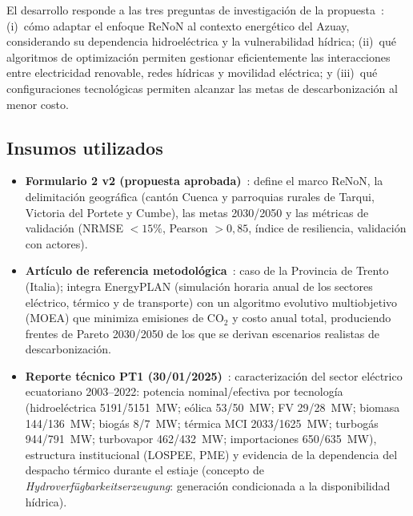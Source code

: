 \documentclass[11pt,a4paper]{article}
\begin{document}
El desarrollo responde a las tres preguntas de investigaci\'on de la
propuesta~\cite{formulario2}: (i)~c\'omo adaptar el enfoque ReNoN al contexto energ\'etico
del Azuay, considerando su dependencia hidroel\'ectrica y la vulnerabilidad h\'idrica;
(ii)~qu\'e algoritmos de optimizaci\'on permiten gestionar eficientemente las interacciones
entre electricidad renovable, redes h\'idricas y movilidad el\'ectrica; y (iii)~qu\'e
configuraciones tecnol\'ogicas permiten alcanzar las metas de descarbonizaci\'on al menor
costo.

\subsection{Insumos utilizados}
\begin{itemize}[leftmargin=1.4em]
  \item \textbf{Formulario 2 v2 (propuesta aprobada)}~\cite{formulario2}: define el
  marco ReNoN, la delimitaci\'on geogr\'afica (cant\'on Cuenca y parroquias rurales de
  Tarqui, Victoria del Portete y Cumbe), las metas 2030/2050 y las m\'etricas de
  validaci\'on (NRMSE $<15\%$, Pearson $>0{,}85$, \'indice de resiliencia,
  validaci\'on con actores).
  \item \textbf{Art\'iculo de referencia metodol\'ogica}~\cite{viesi2020}: caso de la
  Provincia de Trento (Italia); integra EnergyPLAN (simulaci\'on horaria anual de los
  sectores el\'ectrico, t\'ermico y de transporte) con un algoritmo evolutivo
  multiobjetivo (MOEA) que minimiza emisiones de CO$_2$ y costo anual total, produciendo
  frentes de Pareto 2030/2050 de los que se derivan escenarios realistas de
  descarbonizaci\'on.
  \item \textbf{Reporte t\'ecnico PT1 (30/01/2025)}~\cite{reporte2025}: caracterizaci\'on
  del sector el\'ectrico ecuatoriano 2003--2022: potencia nominal/efectiva por
  tecnolog\'ia (hidroel\'ectrica 5191/5151~MW; e\'olica 53/50~MW; FV 29/28~MW;
  biomasa 144/136~MW; biog\'as 8/7~MW; t\'ermica MCI 2033/1625~MW; turbog\'as 944/791~MW;
  turbovapor 462/432~MW; importaciones 650/635~MW), estructura institucional (LOSPEE,
  PME) y evidencia de la dependencia del despacho t\'ermico durante el estiaje
  (concepto de \emph{Hydroverf\"ugbarkeitserzeugung}: generaci\'on condicionada a la
  disponibilidad h\'idrica).
\end{itemize}

\end{document}
